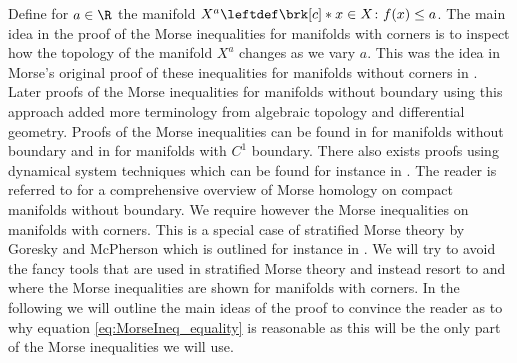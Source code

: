 Define for $a\in\R$ the manifold $X^a\leftdef\brk[c]*{x\in X\colon f(x)\leq a}$.
The main idea in the proof of the Morse inequalities for manifolds with corners is to inspect how the topology of the manifold $X^a$ changes as we vary $a$.
This was the idea in Morse's original proof of these inequalities for manifolds without corners in \cite{Morse1925}.
Later proofs of the Morse inequalities for manifolds without boundary using this approach added more terminology from algebraic topology and differential geometry.
Proofs of the Morse inequalities can be found in \cite[§5]{Milnor1963} for manifolds without boundary and 
in \cite[Theorem 10.2']{Morse1969} for manifolds with $C^1$ boundary.
There also exists proofs using dynamical system techniques
which can be found for instance in \cite{Smale1960}.
The reader is referred to \cite{Banyaga2004} for a comprehensive overview of Morse homology
on compact manifolds without boundary.
We require however the Morse inequalities on manifolds with corners.
This is a special case of stratified Morse theory by Goresky and McPherson which is outlined for instance in \cite[§5.5]{Cisneros2020}.
We will try to avoid the fancy tools that are used in stratified Morse theory and instead
resort to \cite{Agrach1991} and \cite{Handron2002} where the Morse inequalities are shown for
manifolds with corners.
In the following we will outline the main ideas of the proof to convince the reader
as to why equation \eqref{eq:MorseIneq_equality} is reasonable as this will be the only part of the 
Morse inequalities we will use.
% 
